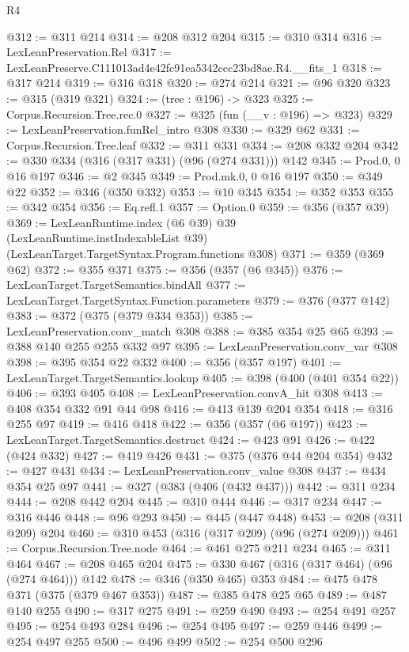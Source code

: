 \begin{lexlean}{R4}
\begin{coremodule}
@312 := @311 @214
@314 := @208 @312 @204
@315 := @310 @314
@316 := LexLeanPreservation.Rel
@317 := LexLeanPreserve.C111013ad4e42fc91ea5342ccc23bd8ae.R4.__fits_1
@318 := @317 @214
@319 := @316 @318
@320 := @274 @214
@321 := @96 @320
@323 := @315 (@319 @321)
@324 := (tree : @196) -> @323
@325 := Corpus.Recursion.Tree.rec.{0}
@327 := @325 (fun (__v : @196) => @323)
@329 := LexLeanPreservation.funRel_intro @308
@330 := @329 @62
@331 := Corpus.Recursion.Tree.leaf
@332 := @311 @331
@334 := @208 @332 @204
@342 := @330 @334 (@316 (@317 @331) (@96 (@274 @331))) @142
@345 := Prod.{0, 0} @16 @197
@346 := @2 @345
@349 := Prod.mk.{0, 0} @16 @197
@350 := @349 @22
@352 := @346 (@350 @332)
@353 := @10 @345
@354 := @352 @353
@355 := @342 @354
@356 := Eq.refl.{1}
@357 := Option.{0}
@359 := @356 (@357 @39)
@369 := LexLeanRuntime.index
    (@6 @39)
    @39
    (LexLeanRuntime.instIndexableList @39)
    (LexLeanTarget.TargetSyntax.Program.functions @308)
@371 := @359 (@369 @62)
@372 := @355 @371
@375 := @356 (@357 (@6 @345))
@376 := LexLeanTarget.TargetSemantics.bindAll
@377 := LexLeanTarget.TargetSyntax.Function.parameters
@379 := @376 (@377 @142)
@383 := @372 (@375 (@379 @334 @353))
@385 := LexLeanPreservation.conv_match @308
@388 := @385 @354 @25 @65
@393 := @388 @140 @255 @255 @332 @97
@395 := LexLeanPreservation.conv_var @308
@398 := @395 @354 @22 @332
@400 := @356 (@357 @197)
@401 := LexLeanTarget.TargetSemantics.lookup
@405 := @398 (@400 (@401 @354 @22))
@406 := @393 @405
@408 := LexLeanPreservation.convA_hit @308
@413 := @408 @354 @332 @91 @44 @98
@416 := @413 @139 @204 @354
@418 := @316 @255 @97
@419 := @416 @418
@422 := @356 (@357 (@6 @197))
@423 := LexLeanTarget.TargetSemantics.destruct
@424 := @423 @91
@426 := @422 (@424 @332)
@427 := @419 @426
@431 := @375 (@376 @44 @204 @354)
@432 := @427 @431
@434 := LexLeanPreservation.conv_value @308
@437 := @434 @354 @25 @97
@441 := @327 (@383 (@406 (@432 @437)))
@442 := @311 @234
@444 := @208 @442 @204
@445 := @310 @444
@446 := @317 @234
@447 := @316 @446
@448 := @96 @293
@450 := @445 (@447 @448)
@453 := @208 (@311 @209) @204
@460 := @310 @453 (@316 (@317 @209) (@96 (@274 @209)))
@461 := Corpus.Recursion.Tree.node
@464 := @461 @275 @211 @234
@465 := @311 @464
@467 := @208 @465 @204
@475 := @330 @467 (@316 (@317 @464) (@96 (@274 @464))) @142
@478 := @346 (@350 @465) @353
@484 := @475 @478 @371 (@375 (@379 @467 @353))
@487 := @385 @478 @25 @65
@489 := @487 @140 @255
@490 := @317 @275
@491 := @259 @490
@493 := @254 @491 @257
@495 := @254 @493 @284
@496 := @254 @495
@497 := @259 @446
@499 := @254 @497 @255
@500 := @496 @499
@502 := @254 @500 @296

\end{coremodule}
\end{lexlean}
